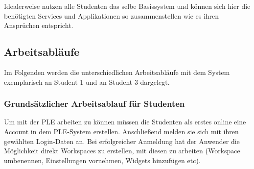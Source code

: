 Idealerweise nutzen alle Studenten das selbe Basissystem und können sich hier die benötigten Services und Applikationen so zusammenstellen wie es ihren Ansprüchen entspricht.

\subsection{Arbeitsabläufe}
Im Folgenden werden die unterschiedlichen Arbeitsabläufe mit dem System exemplarisch an Student 1 und an Student 3 dargelegt.

\subsubsection{Grundsätzlicher Arbeitsablauf für Studenten}
Um mit der PLE arbeiten zu können müssen die Studenten als erstes online eine Account in dem PLE-System erstellen. Anschließend melden sie sich mit ihren gewählten Login-Daten an. Bei erfolgreicher Anmeldung hat der Anwender die Möglichkeit direkt Workspaces zu erstellen, mit diesen zu arbeiten (Workspace umbenennen, Einstellungen vornehmen, Widgets hinzufügen etc).

